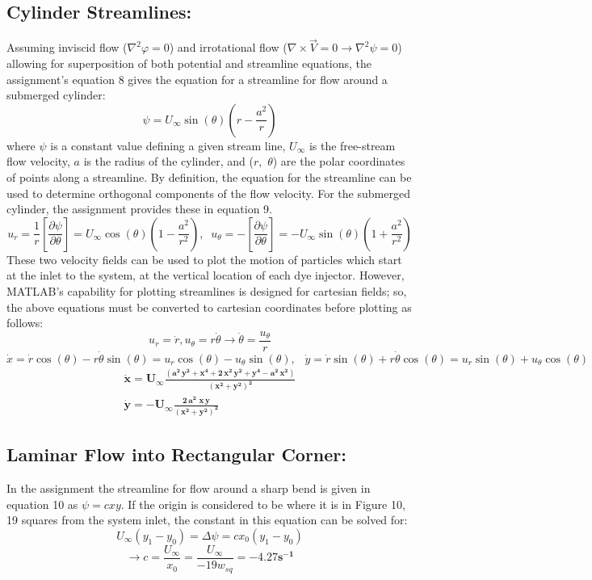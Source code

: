 \documentclass[12pt]{article}
\begin{document}
	\subsection{Cylinder Streamlines:}
	Assuming inviscid flow ($\nabla^{2}\varphi=0$) and irrotational flow ($\nabla\times\vec{V}=0 \rightarrow \nabla^{2}\psi=0$) allowing for superposition of both potential and streamline equations, the assignment's equation 8 gives the equation for a streamline for flow around a submerged cylinder:
	\begin{equation}
	\psi = U_{\infty}\sin{(\theta)}\left(r-\frac{a^{2}}{r}\right)
	\end{equation}
	where $\psi$ is a constant value defining a given stream line, $U_{\infty}$ is the free-stream flow velocity, $a$ is the radius of the cylinder, and ($r,$ $\theta$) are the polar coordinates of points along a streamline.
	\hfill\break\break
	By definition, the equation for the streamline can be used to determine orthogonal components of the flow velocity. For the submerged cylinder, the assignment provides these in equation 9.
	\begin{equation}
	u_{r}=\frac{1}{r}\left[\frac{\partial\psi}{\partial\theta}\right]=U_{\infty}\cos{(\theta)}\left(1-\frac{a^2}{r^2}\right),
	\;\;u_{\theta}=-\left[\frac{\partial\psi}{\partial\theta}\right]=-U_{\infty}\sin{(\theta)}\left(1+\frac{a^2}{r^2}\right)
	\end{equation}
	\hfill\break
	These two velocity fields can be used to plot the motion of particles which start at the inlet to the system, at the vertical location of each dye injector.
	\hfill\break However, MATLAB's capability for plotting streamlines is designed for cartesian fields; so, the above equations must be converted to cartesian coordinates before plotting as follows:
	$$u_r=\dot r, u_\theta=r\dot\theta \rightarrow \dot\theta=\frac{u_\theta}{r}$$
	$$\dot x = \dot{r}\cos{(\theta)} - r\dot\theta\sin{(\theta)}=u_r\cos{(\theta)}-u_\theta\sin{(\theta)},\;\;\:\dot y = \dot{r}\sin{(\theta)} + r\dot\theta\cos{(\theta)}=u_r\sin{(\theta)}+u_\theta\cos{(\theta)}$$
	\begin{align}
		\pmb{\dot x= U_\infty\frac{\left(a^2\,y^2+x^4+2\,x^2\,y^2+y^4-a^2\,x^2\right)}{{\left(x^2+y^2\right)}^2}} \\
		\pmb{\dot y = -U_\infty\frac{2\,a^2\,\,x\,y}{{\left(x^2+y^2\right)}^2}}
	\end{align}
	\hfill\break\break\break\break\break\break\break\break
	\subsection{Laminar Flow into Rectangular Corner:}
	In the assignment the streamline for flow around a sharp bend is given in equation 10 as $\psi=cxy$.  If the origin is considered to be where it is in Figure 10, 19 squares from the system inlet, the constant in this equation can be solved for:
	$$U_\infty(y_1-y_0)=\Delta\psi=cx_0(y_1-y_0)$$
	$$\rightarrow c = \frac{U_\infty}{x_0} = \frac{U_\infty}{-19w_{sq}}=\pmb{-4.27 s^{-1}}$$ 
	
\end{document}
